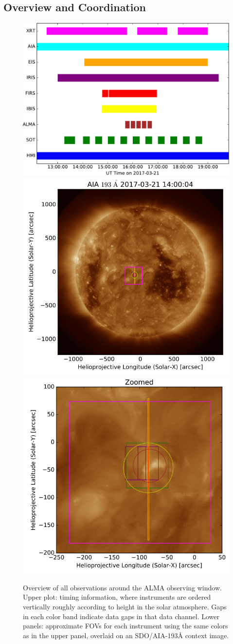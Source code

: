 \documentclass[twocolumn]{aastex62}
\begin{document}
\subsection{Overview and Coordination}
\begin{figure}
    \centering
    \includegraphics[width=0.95\linewidth]{figures/obs_timing}
    \includegraphics[width=0.48\linewidth]{figures/AIA193_FOVs.png}
    \includegraphics[width=0.48\linewidth]{figures/AIA193_FOVs_zoom.png}
    \caption{Overview of all observations around the ALMA observing window.  Upper plot: timing information, where instruments are ordered vertically roughly according to height in the solar atmosphere.  Gaps in each color band indicate data gaps in that data channel.  Lower panels: approximate FOVs for each instrument using the same colors as in the upper panel, overlaid on an SDO/AIA-193\AA{} context image.}
    \label{fig:coordination}
\end{figure}
\end{document}
